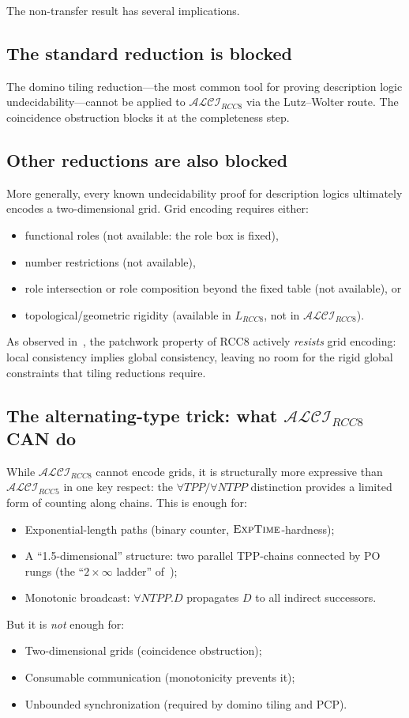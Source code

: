\documentclass[11pt]{article}
\newcommand{\ALCIRCC}[1]{\ensuremath{\mathcal{ALCI}_{\mathit{RCC#1}}}}
\newcommand{\LRCC}[1]{\ensuremath{L_{\mathit{RCC#1}}}}
\newcommand{\EXPTIME}{\textsc{ExpTime}}
\begin{document}
The non-transfer result has several implications.

\subsection{The standard reduction is blocked}

The domino tiling reduction---the most common tool for proving description
logic undecidability---cannot be applied to $\ALCIRCC{8}$ via the
Lutz--Wolter route.  The coincidence obstruction blocks it at the completeness
step.

\subsection{Other reductions are also blocked}

More generally, every known undecidability proof for description logics
ultimately encodes a two-dimensional grid.  Grid encoding requires either:
\begin{itemize}
  \item functional roles (not available: the role box is fixed),
  \item number restrictions (not available),
  \item role intersection or role composition beyond the fixed table (not available), or
  \item topological/geometric rigidity (available in $\LRCC{8}$, not in $\ALCIRCC{8}$).
\end{itemize}
As observed in~\cite{OurMainPaper}, the patchwork property of RCC8 actively
\emph{resists} grid encoding: local consistency implies global consistency,
leaving no room for the rigid global constraints that tiling reductions require.

\subsection{The alternating-type trick: what $\ALCIRCC{8}$ CAN do}

While $\ALCIRCC{8}$ cannot encode grids, it is structurally more expressive
than $\ALCIRCC{5}$ in one key respect: the $\forall TPP / \forall NTPP$
distinction provides a limited form of counting along chains.  This is enough
for:
\begin{itemize}
  \item Exponential-length paths (binary counter, $\EXPTIME$-hardness);
  \item A ``1.5-dimensional'' structure: two parallel TPP-chains connected by PO
    rungs (the ``$2 \times \infty$ ladder'' of~\cite{OurMainPaper});
  \item Monotonic broadcast: $\forall NTPP.D$ propagates $D$ to all indirect
    successors.
\end{itemize}
But it is \emph{not} enough for:
\begin{itemize}
  \item Two-dimensional grids (coincidence obstruction);
  \item Consumable communication (monotonicity prevents it);
  \item Unbounded synchronization (required by domino tiling and PCP).
\end{itemize}
\end{document}
